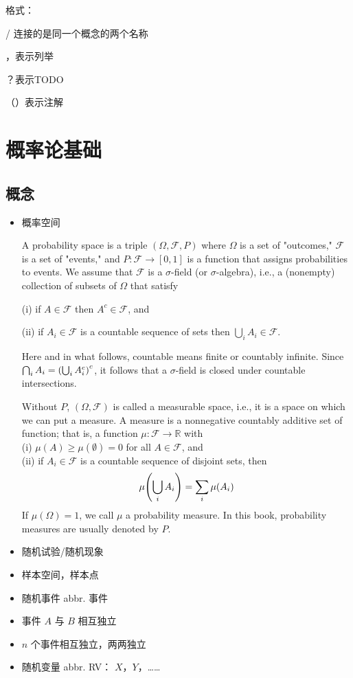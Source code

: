 \documentclass[12pt,uft8]{ctexrep}
\begin{document}
格式：

/ 连接的是同一个概念的两个名称

，表示列举

？表示TODO

（）表示注解

\chapter{概率论基础}
\section{概念}
\begin{itemize}
\item 概率空间

A probability space is a triple $(\Omega, \mathcal{F}, P)$ where $\Omega$ is a set of "outcomes," $\mathcal{F}$ is a set of "events," and $P\colon \mathcal{F} \to [0,1] $ is a function that assigns probabilities to events. We assume that $\mathcal{F}$ is a $\sigma$-field (or $\sigma$-algebra), i.e., a (nonempty) collection of subsets of $\Omega$ that satisfy

(i) if $A\in\mathcal{F}$ then $A^c \in\mathcal{F}$, and 

(ii) if $A_i\in\mathcal{F}$ is a countable sequence of sets then $\bigcup_iA_i\in\mathcal{F}$.

Here and in what follows, countable means finite or countably infinite. Since $\bigcap_iA_i = \qty(\bigcup_iA_i^c)^c$, it follows that a $\sigma$-field is closed under countable intersections.

Without $P$, $(\Omega,\mathcal{F})$ is called a measurable space, i.e., it is a space on which we can put a measure. A measure is a nonnegative countably additive set of function; that is, a function $\mu\colon\mathcal{F}\to\mathbb{R}$ with\\
(i) $\mu(A)\ge\mu(\emptyset) = 0$ for all $A\in\mathcal{F}$, and\\
(ii) if $A_i\in\mathcal{F}$ is a countable sequence of disjoint sets, then
\[
    \mu\qty(\bigcup_iA_i) = \sum_i\mu(A_i)
\]
If $\mu(\Omega) = 1$, we call $\mu$ a probability measure. In this book, probability measures are usually denoted by $P$.
\item 随机试验/随机现象
\item 样本空间，样本点
\item 随机事件 abbr. 事件
\item 事件 $A$ 与 $B$ 相互独立
\item $n$ 个事件相互独立，两两独立
\item 随机变量 abbr. RV： $X$，$Y$，……


\end{itemize}
\end{document}
